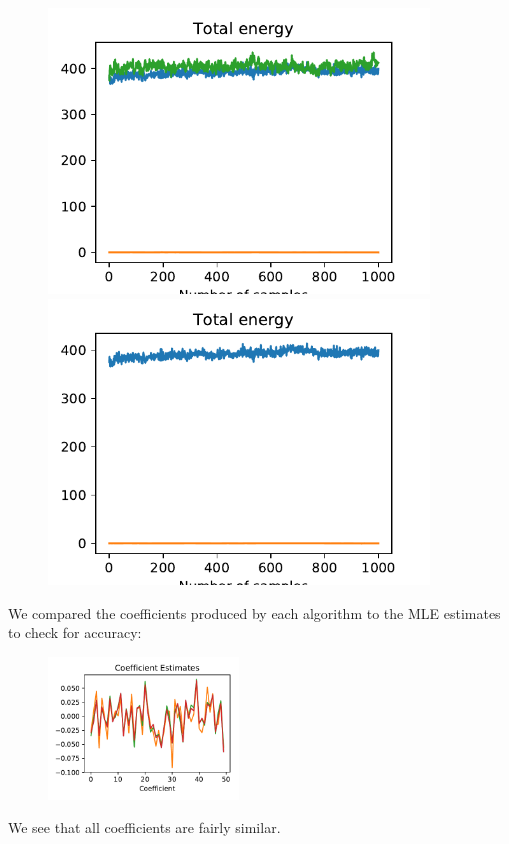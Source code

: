 \begin{figure}[H]
	\centering
	\begin{minipage}{0.45\textwidth}
		\centering
		\includegraphics[width=0.9\textwidth]{sghmc-energy-sim.pdf} %
	\end{minipage}\hfill
	\begin{minipage}{0.45\textwidth}
		\centering
		\includegraphics[width=0.9\textwidth]{sghmc-trace-sim.pdf} %
	\end{minipage}
\end{figure}

We compared the coefficients produced by each algorithm to the MLE estimates to check for accuracy:

\begin{figure}[H]
	\centering
	\includegraphics[width=0.45\textwidth]{coefs-sim.pdf}
\end{figure}

We see that all coefficients are fairly similar.